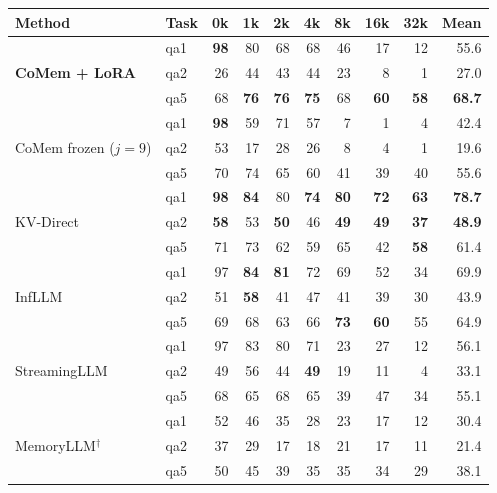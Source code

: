 \begin{table}[!htbp]
\centering
\small
\setlength{\tabcolsep}{3pt}
\begin{tabular}{@{}llrrrrrrrr@{}}
\toprule
\textbf{Method} & \textbf{Task}
& \textbf{0k} & \textbf{1k} & \textbf{2k} & \textbf{4k}
& \textbf{8k} & \textbf{16k} & \textbf{32k} & \textbf{Mean} \\
\midrule
\multirow{3}{*}{\textbf{CoMem + LoRA}}
& qa1 & \textbf{98} & 80 & 68 & 68 & 46 & 17 & 12 & 55.6 \\
& qa2 & 26 & 44 & 43 & 44 & 23 & 8 & 1 & 27.0 \\
& qa5 & 68 & \textbf{76} & \textbf{76} & \textbf{75}
      & 68 & \textbf{60} & \textbf{58} & \textbf{68.7} \\
\midrule
\multirow{3}{*}{CoMem frozen ($j{=}9$)}
& qa1 & \textbf{98} & 59 & 71 & 57 & 7 & 1 & 4 & 42.4 \\
& qa2 & 53 & 17 & 28 & 26 & 8 & 4 & 1 & 19.6 \\
& qa5 & 70 & 74 & 65 & 60 & 41 & 39 & 40 & 55.6 \\
\midrule
\multirow{3}{*}{KV-Direct}
& qa1 & \textbf{98} & \textbf{84} & 80 & \textbf{74}
      & \textbf{80} & \textbf{72} & \textbf{63} & \textbf{78.7} \\
& qa2 & \textbf{58} & 53 & \textbf{50} & 46
      & \textbf{49} & \textbf{49} & \textbf{37} & \textbf{48.9} \\
& qa5 & 71 & 73 & 62 & 59 & 65 & 42 & \textbf{58} & 61.4 \\
\midrule
\multirow{3}{*}{InfLLM}
& qa1 & 97 & \textbf{84} & \textbf{81} & 72 & 69 & 52 & 34 & 69.9 \\
& qa2 & 51 & \textbf{58} & 41 & 47 & 41 & 39 & 30 & 43.9 \\
& qa5 & 69 & 68 & 63 & 66 & \textbf{73} & \textbf{60} & 55 & 64.9 \\
\midrule
\multirow{3}{*}{StreamingLLM}
& qa1 & 97 & 83 & 80 & 71 & 23 & 27 & 12 & 56.1 \\
& qa2 & 49 & 56 & 44 & \textbf{49} & 19 & 11 & 4 & 33.1 \\
& qa5 & 68 & 65 & 68 & 65 & 39 & 47 & 34 & 55.1 \\
\midrule
\multirow{3}{*}{MemoryLLM$^{\dagger}$}
& qa1 & 52 & 46 & 35 & 28 & 23 & 17 & 12 & 30.4 \\
& qa2 & 37 & 29 & 17 & 18 & 21 & 17 & 11 & 21.4 \\
& qa5 & 50 & 45 & 39 & 35 & 35 & 34 & 29 & 38.1 \\

\end{tabular}
\end{table}
